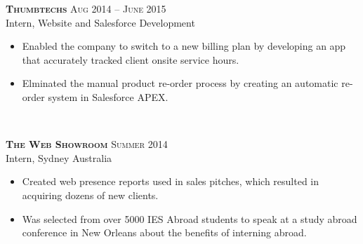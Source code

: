\documentclass[10pt]{article} %
\begin{document}
{\raggedright

\large \textsc{\textbf{Thumbtechs}} \hfill \small{\textsc{Aug 2014 -- June 2015}}\\
Intern, Website and Salesforce Development}
\normalsize{
\begin{itemize}
\item Enabled the company to switch to a new billing plan by developing an app that accurately tracked client onsite service hours.
\item Elminated the manual product re-order process by creating an automatic re-order system in Salesforce APEX.
\end{itemize}
}\\
\hfill

{\raggedright \large \textsc{\textbf{The Web Showroom}} \hfill \small{\textsc{Summer 2014}}\\
Intern, Sydney Australia}
\normalsize{
\begin{itemize}
\item Created web presence reports used in sales pitches, which resulted in acquiring dozens of new clients.
\item Was selected from over 5000 IES Abroad students to speak at a study abroad conference in New Orleans about the benefits of interning abroad.
\end{itemize}
}\\
\hfill

\end{document}
